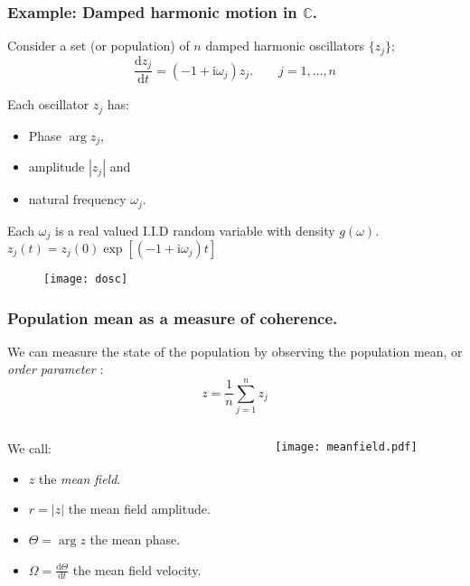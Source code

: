 \documentclass[10pt,reqno]{beamer}
\newcommand{\D}[2]{\frac{\mathrm{d} #1}{\mathrm{d} #2}}
\newcommand{\I}{\mathrm{i}}
\newcommand{\complex}{\mathbb{C}}
\begin{document}
\begin{frame}[t]
\frametitle{Example: Damped harmonic motion in $\complex$.} 
Consider a set (or population) of $n$ damped harmonic oscillators $\{z_j\}$;
\[
\D{z_j}{t} =(-1+\I\omega_j)z_j. \qquad j=1,\ldots,n
\] 
\begin{minipage}{0.49\textwidth}

\vspace{0.5cm}
Each oscillator $z_j$ has:
\begin{itemize}
	\item Phase $\arg{z_j}$,
	\item amplitude $|z_j|$ and 
	\item natural frequency $\omega_j$.
\end{itemize}

Each $\omega_j$ is a real valued I.I.D random variable with density $g(\omega)$.\\

$z_j(t) = z_j(0)\exp[(-1+\I\omega_j)t]$
\end{minipage}
\begin{minipage}{0.49\textwidth}
	\begin{figure}
		\texttt{[image: dosc]}
	\end{figure}
	\centering

\end{minipage}
\end{frame}
\begin{frame}
\frametitle{Population mean as a measure of coherence.}
We can measure the state of the population by observing the population mean, or {\em order parameter} \cite{kuramoto75}:
\[
z = \frac{1}{n}\sum_{j=1}^n z_j
\]
\begin{columns}
\begin{column}{0.59\textwidth}
	We call:
	\begin{itemize}
		\item $z$ the {\em mean field}.
		\item $r=|z|$ the mean field amplitude.
		\item $\Theta = \arg{z}$ the mean phase.
		\item $\Omega = \D{\Theta}{t}$ the mean field velocity.
	\end{itemize}
\end{column}
\begin{column}{0.39\textwidth}
	\begin{figure}
		\texttt{[image: meanfield.pdf]}
	\end{figure}
\end{column}
\end{columns}
\end{frame}
\end{document}
